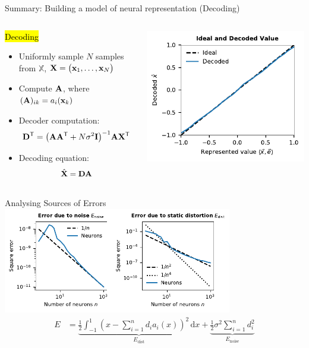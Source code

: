 \documentclass[handout,aspectratio=169]{beamer}
\begin{document}
\begin{frame}{Summary: Building a model of neural representation (Decoding)}
	\begin{columns}
		\begin{block}{\hl{Decoding}}
		\begin{itemize}
			\setlength{\itemsep}{0.25cm}
			\item Uniformly sample $N$ samples from $\mathbb{X}$, ${\mathbf{X}} = \big( {\mathbf{x}}_1, \ldots, {\mathbf{x}}_N \big)$
			\item Compute ${\mathbf{A}}$, where $({\mathbf{A}})_{ik} = a_i({\mathbf{x}}_k)$
			\item Decoder computation:\vspace{-0.25cm}
			$${\mathbf{D}}^{\mathsf{T}} = \big( {\mathbf{A}} {\mathbf{A}}^{\mathsf{T}} + N \sigma^2 {\mathbf{I}} \big)^{-1} {\mathbf{A}} {\mathbf{X}}^{\mathsf{T}}$$
			\item Decoding equation:\vspace{-0.25cm}
			$$\hat{{\mathbf{X}}} = {\mathbf{D}} {\mathbf{A}}$$
		\end{itemize}
		\end{block}
		\includegraphics{media/decoding.pdf}
	\end{columns}
\end{frame}

\begin{frame}{Analysing Sources of Errors}
	\centering
	\includegraphics[width=0.75\textwidth]{media/error_experiment.pdf}
	\begin{align*}
		E &= \underbrace{\frac{1}2 \int_{-1}^1 \left(x - \sum_{i = 1}^n d_i a_i(x) \right)^2 \,\mathrm{d}x}_{E_\mathrm{dist}} + \underbrace{\frac{1}2 \sigma^2 \sum_{i = 1}^n d_i^2}_{E_\mathrm{noise}}
	\end{align*}
\end{frame}
\end{document}
